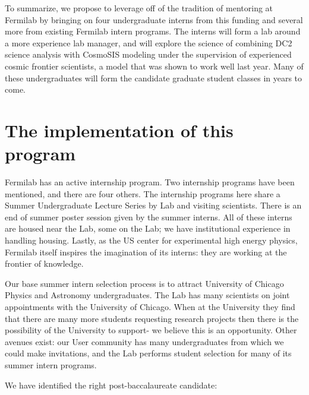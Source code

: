 To summarize, we  propose to leverage off of the tradition 
of mentoring at Fermilab by
bringing on four undergraduate interns from this funding
and several more from existing Fermilab intern programs.
The interns will form a lab around a more experience
lab manager, and will explore the science
of combining DC2 science analysis with CosmoSIS modeling
under the supervision of experienced cosmic
frontier scientists, a model that was shown to work
well last year. Many of these  undergraduates will
form the candidate graduate student classes in years to come.

\newpage
\section{The implementation of this program}

Fermilab has an active internship program. Two internship programs
have been mentioned, and there are four others. The internship
programs here share a Summer Undergraduate Lecture Series by
Lab and visiting scientists. There is an end of summer poster
session given by the summer interns. All of these interns
are housed near the Lab, some on the Lab; we have institutional
experience in handling housing. Lastly, as the US center for
experimental high energy physics, Fermilab itself inspires
the imagination of its interns: they are working at the frontier
of knowledge.

Our base summer intern selection process is to attract
University of Chicago Physics and Astronomy undergraduates.
The Lab has many scientists on joint appointments with
the University of Chicago. When at the University they find
that there are  many more students
requesting research projects then there is the possibility of
the University to support- we believe this is an opportunity.
Other avenues exist: our User community has many undergraduates
from which we could make invitations, 
and the Lab performs student selection for many of its summer
intern programs.

We have identified the right post-baccalaureate candidate:



